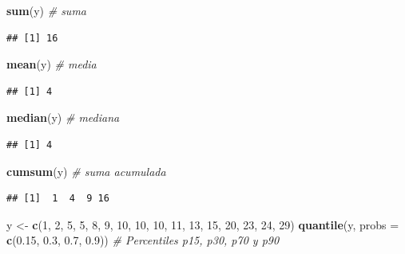 \documentclass[11pt,]{book}
\newenvironment{Shaded}{\begin{snugshade}}{\end{snugshade}}
\newcommand{\CommentTok}[1]{\textcolor[rgb]{0.37,0.37,0.37}{\textit{#1}}}
\newcommand{\DataTypeTok}[1]{\textcolor[rgb]{0.27,0.27,0.27}{#1}}
\newcommand{\DecValTok}[1]{\textcolor[rgb]{0.06,0.06,0.06}{#1}}
\newcommand{\FloatTok}[1]{\textcolor[rgb]{0.06,0.06,0.06}{#1}}
\newcommand{\KeywordTok}[1]{\textcolor[rgb]{0.27,0.27,0.27}{\textbf{#1}}}
\newcommand{\NormalTok}[1]{#1}
\newcommand{\StringTok}[1]{\textcolor[rgb]{0.5,0.5,0.5}{#1}}
\begin{document}
\begin{Shaded}
\begin{Highlighting}[]
\KeywordTok{sum}\NormalTok{(y) }\CommentTok{# suma}
\end{Highlighting}
\end{Shaded}

\begin{verbatim}
## [1] 16
\end{verbatim}

\begin{Shaded}
\begin{Highlighting}[]
\KeywordTok{mean}\NormalTok{(y) }\CommentTok{# media}
\end{Highlighting}
\end{Shaded}

\begin{verbatim}
## [1] 4
\end{verbatim}

\begin{Shaded}
\begin{Highlighting}[]
\KeywordTok{median}\NormalTok{(y) }\CommentTok{# mediana}
\end{Highlighting}
\end{Shaded}

\begin{verbatim}
## [1] 4
\end{verbatim}

\begin{Shaded}
\begin{Highlighting}[]
\KeywordTok{cumsum}\NormalTok{(y) }\CommentTok{# suma acumulada}
\end{Highlighting}
\end{Shaded}

\begin{verbatim}
## [1]  1  4  9 16
\end{verbatim}

\begin{Shaded}
\begin{Highlighting}[]
\NormalTok{y <-}\StringTok{ }\KeywordTok{c}\NormalTok{(}\DecValTok{1}\NormalTok{, }\DecValTok{2}\NormalTok{, }\DecValTok{5}\NormalTok{, }\DecValTok{5}\NormalTok{, }\DecValTok{8}\NormalTok{, }\DecValTok{9}\NormalTok{, }\DecValTok{10}\NormalTok{, }\DecValTok{10}\NormalTok{, }\DecValTok{10}\NormalTok{, }\DecValTok{11}\NormalTok{, }\DecValTok{13}\NormalTok{, }\DecValTok{15}\NormalTok{, }\DecValTok{20}\NormalTok{, }\DecValTok{23}\NormalTok{, }\DecValTok{24}\NormalTok{, }\DecValTok{29}\NormalTok{)}
\KeywordTok{quantile}\NormalTok{(y, }\DataTypeTok{probs =} \KeywordTok{c}\NormalTok{(}\FloatTok{0.15}\NormalTok{, }\FloatTok{0.3}\NormalTok{, }\FloatTok{0.7}\NormalTok{, }\FloatTok{0.9}\NormalTok{)) }\CommentTok{# Percentiles p15, p30, p70 y p90}
\end{Highlighting}
\end{Shaded}
\end{document}
